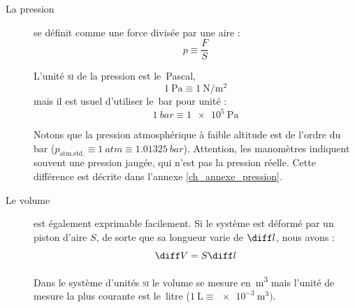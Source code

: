 		\clearfloats
		\begin{description}

			\item[La pression]{se définit comme une force divisée par une aire :
			\begin{equation}
				p \equiv \frac{F}{S}
				\label{def_pression}
			\end{equation}

			L’unité \textsc{si} de la pression est le~\si{Pascal},
			\begin{equation}
				\SI{1}{\pascal} \equiv \SI{1}{\newton\per\metre\squared}
			\end{equation}
			mais il est usuel d’utiliser le~\si{bar} pour unité :
			\begin{equation}
			\SI{1}{bar} \equiv \SI{1e5}{\pascal}
			\end{equation}

			Notons que la pression atmosphérique à faible altitude est de l’ordre du bar ($p_{\text{atm.std.}} \equiv \SI{1}{atm} \equiv \SI{1,01325}{bar}$). Attention, les manomètres indiquent souvent une pression jaugée, qui n’est pas la pression réelle. Cette différence est décrite dans l’annexe \ref{ch_annexe_pression}.
			}%

			\item[Le volume]{est également exprimable facilement. Si le système est déformé par un piston d’aire $S$, de sorte que sa longueur varie de $\diff l$, nous avons :
			\begin{equation}
			\diff V = S \diff l
			\label{eq_volume_surface_longueur}
			\end{equation}

			Dans le système d’unités \textsc{si} le volume se mesure en~\si{\metre\cubed} mais l’unité de mesure la plus courante est le~\si{litre} ($\SI{1}{\liter} \equiv \SI{e-3}{\metre\cubed})$.
			}%
		
		\end{description}

